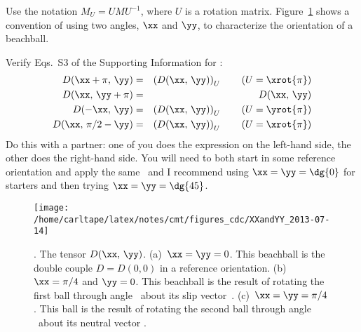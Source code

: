 \documentclass[11pt,titlepage,fleqn]{article}
\newcommand{\fvecb}{\textcolor{blue}{\mbB}}
\newcommand{\fvecs}{\mbS}
\begin{document}
%
Use the notation $M_U=UMU^{-1}$, where $U$ is a rotation matrix. Figure~\ref{fig:XXandYY} shows a convention of using two angles, $\xx$ and $\yy$, to characterize the orientation of a beachball.

Verify Eqs.~S3 of the Supporting Information for \citet{TapeTape2013}:
%
\begin{eqnarray}
D(\xx+\pi,\,\yy)&=&\left(D(\xx,\,\yy)\right)_U\hspace{20pt}(U=\xrot{\pi})
\label{eq1}
\\
D(\xx,\,\yy+\pi)&=&D(\xx,\,\yy)
\label{eq2}
\\
D(-\xx,\,\yy)&=&\left(D(\xx,\,\yy)\right)_U\hspace{20pt}(U=\yrot{\pi})
\label{eq3}
\\
D(\xx,\,\pi/2-\yy)&=&\left(D(\xx,\,\yy)\right)_U\hspace{20pt}(U=\xrot{\pi})
\label{eq4}
\end{eqnarray}
%
Do this with a partner: one of you does the expression on the left-hand side, the other does the right-hand side. You will need to both start in some reference orientation and apply the same \xx\ and \yy\; I recommend using $\xx=\yy=\dg{0}$ for starters and then trying $\xx=\yy=\dg{45}$.


\begin{figure}[h]
\center
\texttt{[image: /home/carltape/latex/notes/cmt/figures\_cdc/XXandYY\_2013-07-14]}
\caption{
\citep[Figure~8 of][]{TapeTape2013}. The tensor $D(\xx,\,\yy)$.
(a)~$\xx=\yy=0$. This beachball is the double couple $D=D(0,0)$ in a reference orientation.
(b)~$\xx=\pi/4$ and $\yy=0$. This beachball is the result of rotating the first ball through angle \xx\ about its slip vector~\fvecs.
(c)~$\xx=\yy=\pi/4$. This ball is the result of rotating the second ball through angle \yy\ about its neutral vector \fvecb.
\label{fig:XXandYY}
}
\end{figure}



\end{document}
